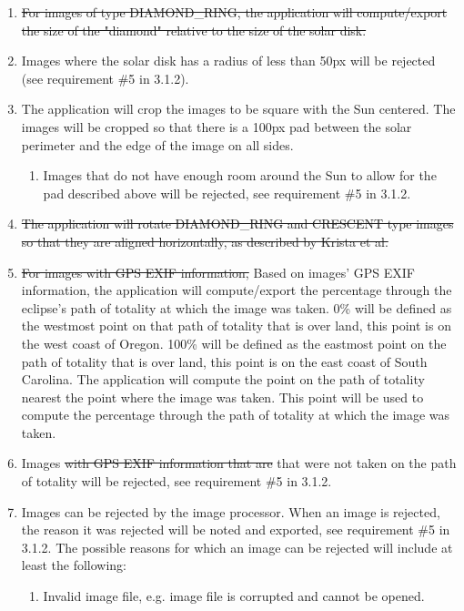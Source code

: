 \documentclass[10pt, onecolumn, draftclsnofoot, letterpaper, compsoc]{IEEEtran}
\begin{document}
\begin{enumerate}
		\item \sout{For images of type DIAMOND\_RING, the application will 
		compute/export the size of the "diamond" relative to the size of 
		the solar disk.}

		\item Images where the solar disk has a radius of less than 50px
		will be rejected (see requirement \#5 in 3.1.2).

		\item The application will crop the images to be square with the 
		Sun centered. The images will be cropped so that there is a 100px
		pad between the solar perimeter and the edge of the image on all 
		sides.
		\begin{enumerate}
			\item Images that do not have enough room around the Sun to 
			allow for the pad described above will be rejected, see requirement \#5 in 3.1.2.
		\end{enumerate}

		\item \sout{The application will rotate DIAMOND\_RING and CRESCENT type 
		images so that they are aligned horizontally, as described by 
		Krista et al.}

		\item \sout{For images with GPS EXIF information,} Based on images' GPS EXIF information, the application will 
		compute/export the percentage through the eclipse's path of 
		totality at which the image was taken. 0\% will be defined as the 
		westmost point on that path of totality that is over land, this 
		point is on the west coast of Oregon. 100\% will be defined as the 
		eastmost point on the path of totality that is over land, this 
		point is on the east coast of South Carolina. The application will
		compute the point on the path of totality nearest the point where 
		the image was taken. This point will be used to compute the 
		percentage through the path of totality at which the image was 
		taken.

		\item Images \sout{with GPS EXIF information that are} that were not taken on the path of
		totality will be rejected, see requirement \#5 in 3.1.2.

		\item Images can be rejected by the image processor. When an image is rejected,
		the reason it was rejected will be noted and exported, see requirement \#5 in 3.1.2.
		The possible reasons for which an image can be rejected will include at least the 
		following:
		\begin{enumerate}
			\item Invalid image file, e.g. image file is corrupted and cannot be opened.


\end{enumerate}
\end{enumerate}
\end{document}

